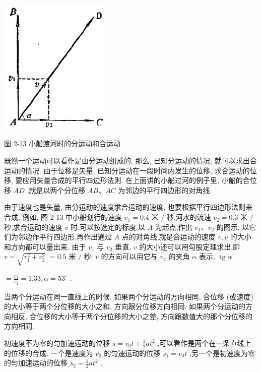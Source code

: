 \documentclass[10pt]{article}
\begin{document}
\begin{center}
\includegraphics[max width=0.4\textwidth]{images/01912d55-147c-70aa-b0e0-1782a122f948_84_330420.jpg}
\end{center}

图 2-13 小船渡河时的分运动和合运动

既然一个运动可以看作是由分运动组成的, 那么, 已知分运动的情况, 就可以求出合运动的情况. 由于位移是矢量, 已知分运动在一段时间内发生的位移, 求合运动的位移, 要应用矢量合成的平行四边形法则. 在上面讲的小船过河的例子里, 小船的合位移 \({AD}\) ,就是以两个分位移 \({AB}\text{、}{AC}\) 为邻边的平行四边形的对角线.

由于速度也是矢量, 由分运动的速度求合运动的速度, 也要根据平行四边形法则来合成. 例如, 图 2-13 中小船划行的速度 \({v}_{1} = {0.4}\) 米 \(/\) 秒,河水的流速 \({v}_{2} = {0.3}\) 米 \(/\) 秒,求合运动的速度 \(v\) 时,可以按选定的标度,以 \(A\) 为起点,作出 \({v}_{1}\text{、}{v}_{2}\) 的图示, 以它们为邻边作平行四边形,再作出通过 \(A\) 点的对角线,就是合运动的速度 \(v,v\) 的大小和方向都可以量出来. 由于 \({v}_{1}\) 与 \({v}_{2}\) 垂直, \(v\) 的大小还可以用勾股定理求出,即 \(v = \sqrt{{v}_{1}^{2} + {v}_{2}^{2}}\) \(= {0.5}\) 米 \(/\) 秒; \(v\) 的方向可以用它与 \({v}_{2}\) 的夹角 \(\alpha\) 表示, \(\operatorname{tg}\alpha\)

\(= \frac{{v}_{1}}{{v}_{2}} = {1.33},\alpha = {53}^{ \circ }\) .

当两个分运动在同一直线上的时候, 如果两个分运动的方向相同, 合位移 (或速度) 的大小等于两个分位移的大小之和, 方向跟分位移方向相同. 如果两个分运动的方向相反, 合位移的大小等于两个分位移的大小之差, 方向跟数值大的那个分位移的方向相同.

初速度不为零的匀加速运动的位移 \(s = {v}_{0}t + \frac{1}{2}a{t}^{2}\) ,可以看作是两个在一条直线上的位移的合成. 一个是速度为 \({v}_{0}\) 的匀速运动的位移 \({s}_{1} = {v}_{0}t\) ,另一个是初速度为零的匀加速运动的位移 \({s}_{2} = \frac{1}{2}a{t}^{2}\) .
\end{document}
